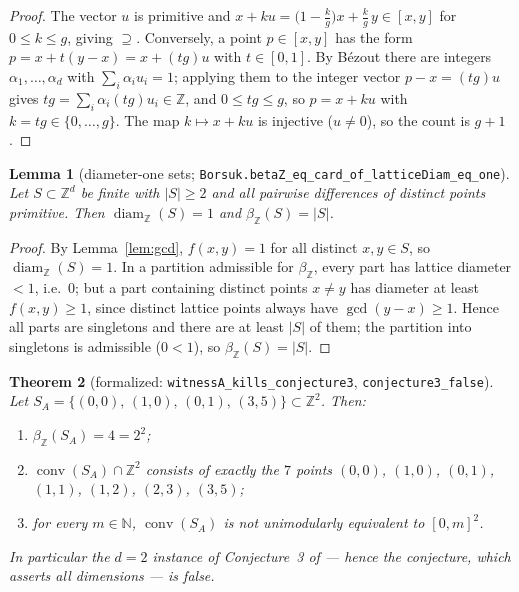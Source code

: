 \documentclass[11pt]{article}
\newtheorem{theorem}{Theorem}[section]
\newtheorem{lemma}[theorem]{Lemma}
\theoremstyle{remark}
\newcommand{\Z}{\mathbb{Z}}
\newcommand{\N}{\mathbb{N}}
\newcommand{\conv}{\operatorname{conv}}
\newcommand{\diamZ}{\operatorname{diam}_{\Z}}
\newcommand{\betaZ}{\beta_{\Z}}
\begin{document}
\begin{proof}
The vector $u$ is primitive and
$x + ku = \bigl(1 - \tfrac{k}{g}\bigr) x + \tfrac{k}{g}\, y \in [x,y]$ for
$0 \le k \le g$, giving $\supseteq$. Conversely, a point $p \in [x,y]$ has
the form $p = x + t(y - x) = x + (tg)u$ with $t \in [0,1]$. By B\'ezout there
are integers $\alpha_1, \dots, \alpha_d$ with $\sum_i \alpha_i u_i = 1$;
applying them to the integer vector $p - x = (tg)u$ gives
$tg = \sum_i \alpha_i (tg) u_i \in \Z$, and $0 \le tg \le g$, so
$p = x + ku$ with $k = tg \in \{0, \dots, g\}$. The map $k \mapsto x + ku$ is
injective ($u \ne 0$), so the count is $g + 1$.
\end{proof}

\begin{lemma}[diameter-one sets;
\texttt{Borsuk.betaZ\_eq\_card\_of\_latticeDiam\_eq\_one}]\label{lem:beta}
Let $S \subset \Z^d$ be finite with $|S| \ge 2$ and all pairwise differences
of distinct points primitive. Then $\diamZ(S) = 1$ and $\betaZ(S) = |S|$.
\end{lemma}

\begin{proof}
By Lemma~\ref{lem:gcd}, $f(x,y) = 1$ for all distinct $x, y \in S$, so
$\diamZ(S) = 1$. In a partition admissible for $\betaZ$, every part has
lattice diameter $< 1$, i.e.\ $0$; but a part containing distinct points
$x \ne y$ has diameter at least $f(x,y) \ge 1$, since distinct lattice points
always have $\gcd(y - x) \geq 1$. Hence all parts are singletons and there
are at least $|S|$ of them; the partition into singletons is admissible
($0 < 1$), so $\betaZ(S) = |S|$.
\end{proof}

\begin{theorem}[formalized: \texttt{witnessA\_kills\_conjecture3},
\texttt{conjecture3\_false}]\label{thm:witnessA}
Let $S_A = \{(0,0),\,(1,0),\,(0,1),\,(3,5)\} \subset \Z^2$. Then:
\begin{enumerate}\itemsep2pt
\item[(i)] $\betaZ(S_A) = 4 = 2^2$;
\item[(ii)] $\conv(S_A) \cap \Z^2$ consists of exactly the $7$ points
$(0,0)$, $(1,0)$, $(0,1)$, $(1,1)$, $(1,2)$, $(2,3)$, $(3,5)$;
\item[(iii)] for every $m \in \N$, $\conv(S_A)$ is not unimodularly
equivalent to $[0,m]^2$.
\end{enumerate}
In particular the $d = 2$ instance of Conjecture~3 of \cite{BDLT2025} ---
hence the conjecture, which asserts all dimensions --- is false.
\end{theorem}
\end{document}
